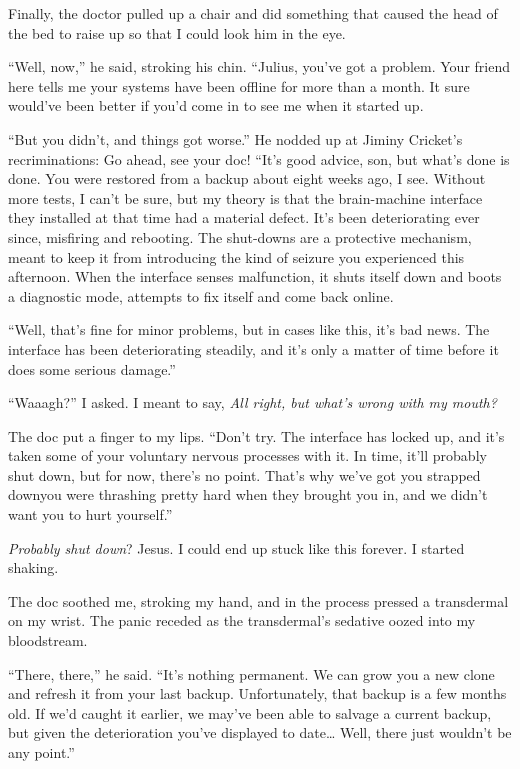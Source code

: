 Finally, the doctor pulled up a chair and did something that caused
the head of the bed to raise up so that I could look him in the
eye.

“Well, now,” he said, stroking his chin. “Julius, you've got a
problem. Your friend here tells me your systems have been offline
for more than a month. It sure would've been better if you'd come
in to see me when it started up.

“But you didn't, and things got worse.” He nodded up at Jiminy
Cricket's recriminations: Go ahead, see your doc! “It's good
advice, son, but what's done is done. You were restored from a
backup about eight weeks ago, I see. Without more tests, I can't be
sure, but my theory is that the brain-machine interface they
installed at that time had a material defect. It's been
deteriorating ever since, misfiring and rebooting. The shut-downs
are a protective mechanism, meant to keep it from introducing the
kind of seizure you experienced this afternoon. When the interface
senses malfunction, it shuts itself down and boots a diagnostic
mode, attempts to fix itself and come back online.

“Well, that's fine for minor problems, but in cases like this, it's
bad news. The interface has been deteriorating steadi\-ly, and it's
only a matter of time before it does some serious damage.”

“Waaagh?” I asked. I meant to say,
\emph{All right, but what's wrong with my mouth?}

The doc put a finger to my lips. “Don't try. The interface has
locked up, and it's taken some of your voluntary nervous processes
with it. In time, it'll probably shut down, but for now, there's no
point. That's why we've got you strapped down{\dash}you were thrashing
pretty hard when they brought you in, and we didn't want you to
hurt yourself.”

\emph{Probably shut down}? Jesus. I could end up stuck like this
forever. I started shaking.

The doc soothed me, stroking my hand, and in the process pressed a
transdermal on my wrist. The panic receded as the transdermal's
sedative oozed into my bloodstream.

“There, there,” he said. “It's nothing permanent. We can grow you a
new clone and refresh it from your last backup. Unfortunately, that
backup is a few months old. If we'd caught it earlier, we may've
been able to salvage a current backup, but given the deterioration
you've displayed to date… Well, there just wouldn't be any point.”

